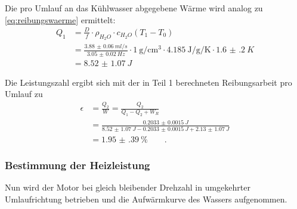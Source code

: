 Die pro Umlauf an das Kühlwasser abgegebene Wärme wird analog zu \cref{eq:reibungswaerme} ermittelt:
\begin{align}
	Q_1&=\frac{D}{f}\cdot \rho_{H_2O}\cdot c_{H_2O}(T_1-T_0) \\
	&=\frac{\SI{3.88(6)}{ml/s}}{\SI{3.05(2)}{Hz}}\cdot \SI{1}{\g\per\cubic\cm}\cdot \SI{4.185}{\joule\per\gram\per\kelvin}\cdot \SI{1.6(2)}{K} \\
	&=\SI{8.52(107)}{J}
\label{eq:q2}
\end{align}

Die Leistungszahl ergibt sich mit der in Teil 1 berechneten Reibungsarbeit pro Umlauf zu
\begin{align}
	\epsilon&=\frac{Q_2}{W}=\frac{Q_2}{Q_1-Q_2+W_R}\\
	&=\frac{\SI{0.2033(15)}{J}}{\SI{8.52(107)}{J}-\SI{0.2033(15)}{J}+\SI{2.13(107)}{J}}\\
	&=\SI{1.95(39)}{\percent}\qquad.
\label{eq:schmelzberechnet}
\end{align}

\subsubsection{Bestimmung der Heizleistung}
Nun wird der Motor bei gleich bleibender Drehzahl in umgekehrter Umlaufrichtung betrieben und die Aufwärmkurve des Wassers aufgenommen.